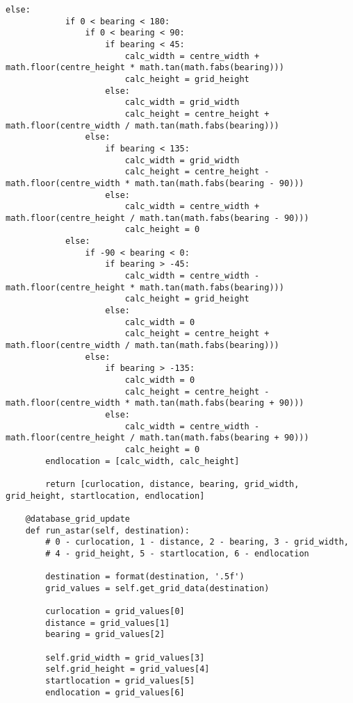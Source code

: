 \begin{lstlisting}[style=custompython, label=astar-code, caption=A-Star algorithm class code]
        else:
            if 0 < bearing < 180:
                if 0 < bearing < 90:
                    if bearing < 45:
                        calc_width = centre_width + math.floor(centre_height * math.tan(math.fabs(bearing)))
                        calc_height = grid_height
                    else:
                        calc_width = grid_width
                        calc_height = centre_height + math.floor(centre_width / math.tan(math.fabs(bearing)))
                else:
                    if bearing < 135:
                        calc_width = grid_width
                        calc_height = centre_height - math.floor(centre_width * math.tan(math.fabs(bearing - 90)))
                    else:
                        calc_width = centre_width + math.floor(centre_height / math.tan(math.fabs(bearing - 90)))
                        calc_height = 0
            else:
                if -90 < bearing < 0:
                    if bearing > -45:
                        calc_width = centre_width - math.floor(centre_height * math.tan(math.fabs(bearing)))
                        calc_height = grid_height
                    else:
                        calc_width = 0
                        calc_height = centre_height + math.floor(centre_width / math.tan(math.fabs(bearing)))
                else:
                    if bearing > -135:
                        calc_width = 0
                        calc_height = centre_height - math.floor(centre_width * math.tan(math.fabs(bearing + 90)))
                    else:
                        calc_width = centre_width - math.floor(centre_height / math.tan(math.fabs(bearing + 90)))
                        calc_height = 0
        endlocation = [calc_width, calc_height]

        return [curlocation, distance, bearing, grid_width, grid_height, startlocation, endlocation]

    @database_grid_update
    def run_astar(self, destination):
        # 0 - curlocation, 1 - distance, 2 - bearing, 3 - grid_width,
        # 4 - grid_height, 5 - startlocation, 6 - endlocation

        destination = format(destination, '.5f')
        grid_values = self.get_grid_data(destination)

        curlocation = grid_values[0]
        distance = grid_values[1]
        bearing = grid_values[2]

        self.grid_width = grid_values[3]
        self.grid_height = grid_values[4]
        startlocation = grid_values[5]
        endlocation = grid_values[6]


\end{lstlisting}
